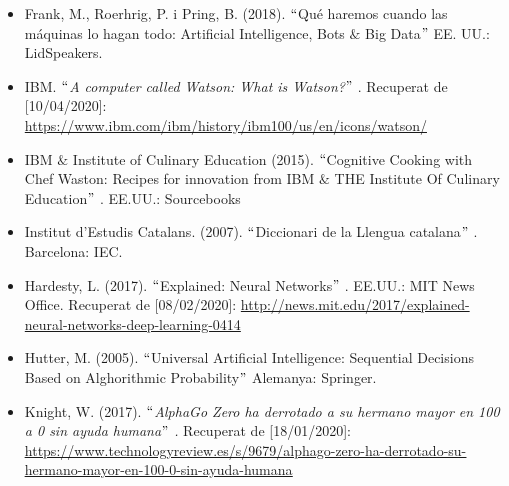 \documentclass[12pt]{article}
\renewcommand{\_}{\kern-1.5pt\textunderscore\kern-1.5pt}
\begin{document}
\begin{itemize}
\begin{itemize}
\vspace{\baselineskip}
	\item Frank, M., Roerhrig, P. i Pring, B. (2018). $``$Qué haremos cuando las máquinas lo hagan todo: Artificial Intelligence, Bots $\&$  Big Data\textit{$"$ } EE. UU.: LidSpeakers.\par


\vspace{\baselineskip}
	\item IBM. $``$\textit{A computer called Watson: What is Watson?}$"$ . Recuperat de [10/04/2020]: \href{https://www.ibm.com/ibm/history/ibm100/us/en/icons/watson/}{https://www.ibm.com/ibm/history/ibm100/us/en/icons/watson/} \par


\vspace{\baselineskip}
	\item IBM $\&$  Institute of Culinary Education (2015). $``$Cognitive Cooking with Chef Waston: Recipes for innovation from IBM $\&$  THE Institute Of Culinary Education$"$ . EE.UU.: Sourcebooks\par


\vspace{\baselineskip}
	\item Institut d’Estudis Catalans. (2007). $``$Diccionari de la Llengua catalana$"$ .\textit{ }Barcelona: IEC.\par


\vspace{\baselineskip}
	\item Hardesty, L. (2017).  $``$Explained: Neural Networks$"$ . EE.UU.: MIT News Office. Recuperat de [08/02/2020]: \href{http://news.mit.edu/2017/explained-neural-networks-deep-learning-0414}{http://news.mit.edu/2017/explained-neural-networks-deep-learning-0414}\par


\vspace{\baselineskip}
	\item Hutter, M. (2005). $``$Universal Artificial Intelligence: Sequential Decisions Based on Alghorithmic Probability\textit{$"$  }Alemanya: Springer.\par


\vspace{\baselineskip}
	\item Knight, W. (2017). $``$\textit{AlphaGo Zero ha derrotado a su hermano mayor en 100 a 0 sin ayuda humana$"$ . } Recuperat de [18/01/2020]: \href{https://www.technologyreview.es/s/9679/alphago-zero-ha-derrotado-su-hermano-mayor-en-100-0-sin-ayuda-humana}{\textcolor[HTML]{0000FF}{\ul{https://www.technologyreview.es/s/9679/alphago-zero-ha-derrotado-su-hermano-mayor-en-100-0-sin-ayuda-humana}}}\par



\end{itemize}
\end{itemize}
\end{document}

